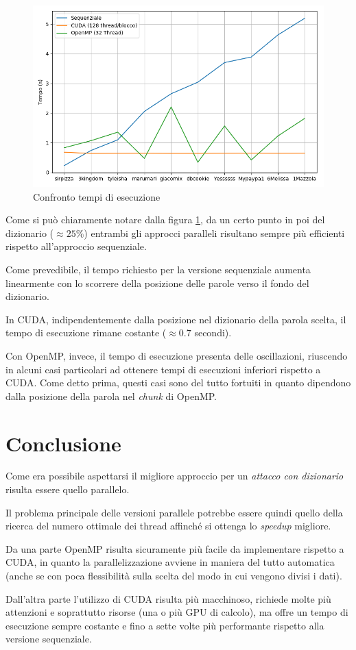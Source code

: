 \documentclass[10pt,twocolumn,letterpaper]{article}
\begin{document}
\begin{figure}[h]
\includegraphics[width=\linewidth]{Plots/tempi.png}
\caption{Confronto tempi di esecuzione}
\label{fig:tempi}
\end{figure}

Come si può chiaramente notare dalla figura \ref{fig:tempi}, da un certo punto in poi del dizionario ($\approx25\%$) entrambi gli approcci paralleli risultano sempre più efficienti rispetto all'approccio sequenziale.

Come prevedibile, il tempo richiesto per la versione sequenziale aumenta linearmente con lo scorrere della posizione delle parole verso il fondo del dizionario. 

In CUDA, indipendentemente dalla posizione nel dizionario della parola scelta, il tempo di esecuzione rimane costante ($\approx0.7$ secondi).

Con OpenMP, invece, il tempo di esecuzione presenta delle oscillazioni, riuscendo in alcuni casi particolari ad ottenere tempi di esecuzioni inferiori rispetto a CUDA. Come detto prima, questi casi sono del tutto fortuiti in quanto dipendono dalla posizione della parola nel \textit{chunk} di OpenMP.

\section{Conclusione}
Come era possibile aspettarsi il migliore approccio per un \textit{attacco con dizionario} risulta essere quello parallelo.

Il problema principale delle versioni parallele potrebbe essere quindi quello della ricerca del numero ottimale dei thread affinché si ottenga lo \textit{speedup} migliore.

Da una parte OpenMP risulta sicuramente più facile da implementare rispetto a CUDA, in quanto la parallelizzazione avviene in maniera del tutto automatica (anche se con poca flessibilità sulla scelta del modo in cui vengono divisi i dati).

Dall'altra parte l'utilizzo di CUDA risulta più macchinoso, richiede molte più attenzioni e soprattutto risorse (una o più GPU di calcolo), ma offre un tempo di esecuzione sempre costante e fino a sette volte più performante rispetto alla versione sequenziale.

{


}
\end{document}
